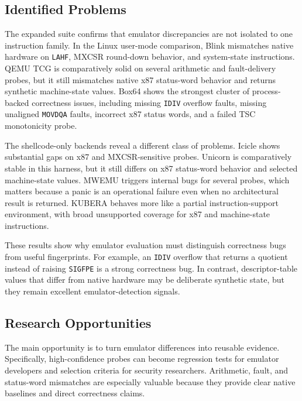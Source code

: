 
\subsection{Identified Problems}

The expanded suite confirms that emulator discrepancies are not isolated to one instruction family. In the Linux user-mode comparison, Blink mismatches native hardware on \texttt{LAHF}, MXCSR round-down behavior, and system-state instructions. QEMU TCG is comparatively solid on several arithmetic and fault-delivery probes, but it still mismatches native x87 status-word behavior and returns synthetic machine-state values. Box64 shows the strongest cluster of process-backed correctness issues, including missing \texttt{IDIV} overflow faults, missing unaligned \texttt{MOVDQA} faults, incorrect x87 status words, and a failed TSC monotonicity probe.

The shellcode-only backends reveal a different class of problems. Icicle shows substantial gaps on x87 and MXCSR-sensitive probes. Unicorn is comparatively stable in this harness, but it still differs on x87 status-word behavior and selected machine-state values. MWEMU triggers internal bugs for several probes, which matters because a panic is an operational failure even when no architectural result is returned. KUBERA behaves more like a partial instruction-support environment, with broad unsupported coverage for x87 and machine-state instructions.

These results show why emulator evaluation must distinguish correctness bugs from useful fingerprints. For example, an \texttt{IDIV} overflow that returns a quotient instead of raising \texttt{SIGFPE} is a strong correctness bug. In contrast, descriptor-table values that differ from native hardware may be deliberate synthetic state, but they remain excellent emulator-detection signals.

\subsection{Research Opportunities}

The main opportunity is to turn emulator differences into reusable evidence. Specifically, high-confidence probes can become regression tests for emulator developers and selection criteria for security researchers. Arithmetic, fault, and status-word mismatches are especially valuable because they provide clear native baselines and direct correctness claims.

